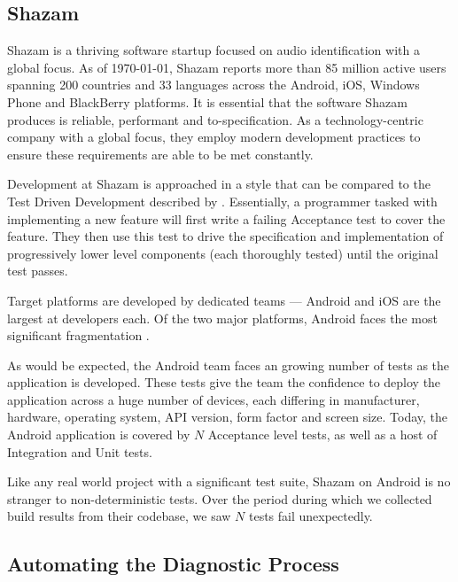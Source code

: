 \subsection{Shazam}

Shazam is a thriving software startup focused on audio identification with a global focus. As of \today, Shazam reports more than 85 million active users spanning 200 countries and 33 languages across the Android, iOS, Windows Phone and BlackBerry platforms. It is essential that the software Shazam produces is reliable, performant and to-specification. As a technology-centric company with a global focus, they employ modern development practices to ensure these requirements are able to be met constantly.

Development at Shazam is approached in a style that can be compared to the Test Driven Development described by \citet*{freeman2009growing}. Essentially, a programmer tasked with implementing a new feature will first write a failing Acceptance test to cover the feature. They then use this test to drive the specification and implementation of progressively lower level components (each thoroughly tested) until the original test passes.

Target platforms are developed by dedicated teams --- Android and iOS are the largest at  developers each. Of the two major platforms, Android faces the most significant fragmentation \cite{AndroidFragmentationVisualized}.

As would be expected, the Android team faces an growing number of tests as the application is developed.  These tests give the team the confidence to deploy the application across a huge number of devices, each differing in manufacturer, hardware, operating system, API version, form factor and screen size. Today, the Android application is covered by $N$  Acceptance level tests, as well as a host of Integration and Unit tests.

Like any real world project with a significant test suite, Shazam on Android is no stranger to non-deterministic tests. Over the period  during which we collected build results from their codebase, we saw $N$ tests fail unexpectedly.

\subsection{Automating the Diagnostic Process}

